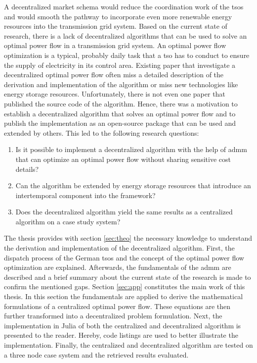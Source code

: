 A decentralized market schema would reduce the coordination work of the \glspl{tso} and would smooth the pathway to incorporate even more renewable energy resources into the transmission grid system. Based on the current state of research, there is a lack of decentralized algorithms that can be used to solve an optimal power flow in a transmission grid system. An optimal power flow optimization is a typical, probably daily task that a \gls{tso} has to conduct to ensure the supply of electricity in its control area. Existing paper that investigate a decentralized optimal power flow often miss a detailed description of the derivation and implementation of the algorithm or miss new technologies like energy storage resources. Unfortunately, there is not even one paper that published the source code of the algorithm. Hence, there was a motivation to establish a decentralized algorithm that solves an optimal power flow and to publish the implementation as an open-source package that can be used and extended by others. This led to the following research questions:

\begin{enumerate}
	\item Is it possible to implement a decentralized algorithm with the help of \gls{admm} that can optimize an optimal power flow without sharing sensitive cost details?
	\item Can the algorithm be extended by energy storage resources that introduce an intertemporal component into the framework?
	\item Does the decentralized algorithm yield the same results as a centralized algorithm on a case study system?
\end{enumerate}

The thesis provides with section \ref{sec:theo} the necessary knowledge to understand the derivation and implementation of the decentralized algorithm. First, the dispatch process of the German \glspl{tso} and the concept of the optimal power flow optimization are explained. Afterwards, the fundamentals of the \gls{admm} are described and a brief summary about the current state of the research is made to confirm the mentioned gaps. Section \ref{sec:app} constitutes the main work of this thesis. In this section the fundamentals are applied to derive the mathematical formulations of a centralized optimal power flow. These equations are then further transformed into a decentralized problem formulation. Next, the implementation in Julia of both the centralized and decentralized algorithm is presented to the reader. Hereby, code listings are used to better illustrate the implementation. Finally, the centralized and decentralized algorithm are tested on a three node case system and the retrieved results evaluated.



